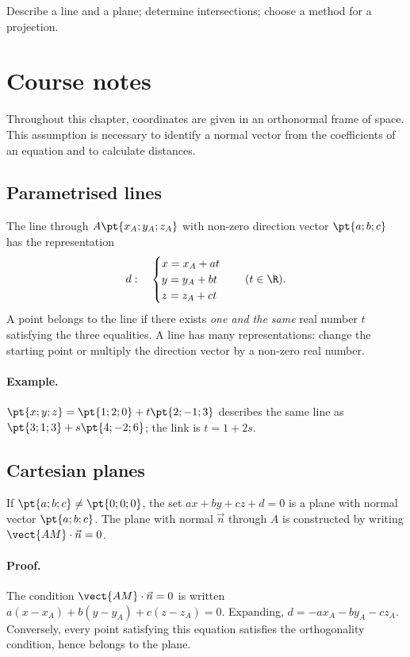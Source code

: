 \label{ch:12}


\begin{keypoint}[Objectives]Describe a line and a plane; determine intersections; choose a method for a projection.\end{keypoint}

\section{Course notes}
Throughout this chapter, coordinates are given in an orthonormal frame of space. This assumption is necessary to identify a normal vector from the coefficients of an equation and to calculate distances.
\subsection{Parametrised lines}
The line through $A\pt{x_A;y_A;z_A}$ with non-zero direction vector $\pt{a;b;c}$ has the representation
\[d:\quad\begin{cases}x=x_A+at\\y=y_A+bt\\z=z_A+ct\end{cases}\quad(t\in\R).\]
A point belongs to the line if there exists \emph{one and the same} real number $t$ satisfying the three equalities. A line has many representations: change the starting point or multiply the direction vector by a non-zero real number.
\paragraph{Example.} $\pt{x;y;z}=\pt{1;2;0}+t\pt{2;-1;3}$ describes the same line as $\pt{3;1;3}+s\pt{4;-2;6}$; the link is $t=1+2s$.
\subsection{Cartesian planes}
\begin{keypoint}
If $\pt{a;b;c}\ne\pt{0;0;0}$, the set $ax+by+cz+d=0$ is a plane with normal vector $\pt{a;b;c}$. The plane with normal $\vec n$ through $A$ is constructed by writing $\vect{AM}\cdot\vec n=0$.
\end{keypoint}
\paragraph{Proof.} The condition $\vect{AM}\cdot\vec n=0$ is written $a(x-x_A)+b(y-y_A)+c(z-z_A)=0$. Expanding, $d=-ax_A-by_A-cz_A$. Conversely, every point satisfying this equation satisfies the orthogonality condition, hence belongs to the plane.
